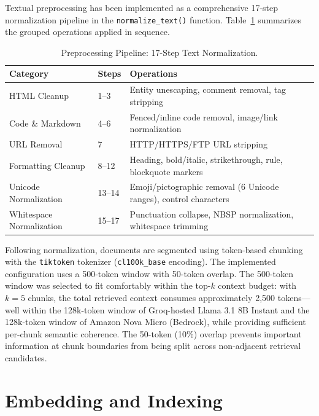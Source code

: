 Textual preprocessing has been implemented as a comprehensive 17-step normalization pipeline in the \texttt{normalize\_text()} function. Table~\ref{tab:preprocess_steps} summarizes the grouped operations applied in sequence.

\begin{table}[H]
\caption{Preprocessing Pipeline: 17-Step Text Normalization.}
\label{tab:preprocess_steps}
\centering
\begin{tabular}{p{3.5cm}p{1.0cm}p{7.5cm}}
\toprule
\textbf{Category} & \textbf{Steps} & \textbf{Operations} \\
\midrule
HTML Cleanup & 1--3 & Entity unescaping, comment removal, tag stripping \\[2pt]
Code \& Markdown & 4--6 & Fenced/inline code removal, image/link normalization \\[2pt]
URL Removal & 7 & HTTP/HTTPS/FTP URL stripping \\[2pt]
Formatting Cleanup & 8--12 & Heading, bold/italic, strikethrough, rule, blockquote markers \\[2pt]
Unicode Normalization & 13--14 & Emoji/pictographic removal (6 Unicode ranges), control characters \\[2pt]
Whitespace Normalization & 15--17 & Punctuation collapse, NBSP normalization, whitespace trimming \\
\bottomrule
\end{tabular}
\end{table}

Following normalization, documents are segmented using token-based chunking with the \texttt{tiktoken} tokenizer (\texttt{cl100k\_base} encoding). The implemented configuration uses a 500-token window with 50-token overlap. The 500-token window was selected to fit comfortably within the top-$k$ context budget: with $k = 5$ chunks, the total retrieved context consumes approximately 2,500 tokens---well within the 128k-token window of Groq-hosted Llama 3.1 8B Instant and the 128k-token window of Amazon Nova Micro (Bedrock), while providing sufficient per-chunk semantic coherence. The 50-token (10\%) overlap prevents important information at chunk boundaries from being split across non-adjacent retrieval candidates.

\section{Embedding and Indexing}
\label{sec:embedding}

